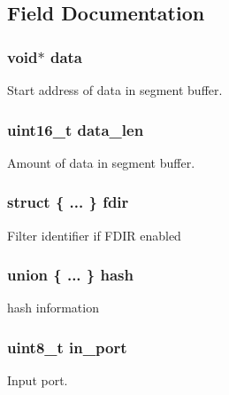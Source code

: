 \subsection{Field Documentation}
\hypertarget{structrte__pktmbuf_a735984d41155bc1032e09bece8f8d66d}{}
\subsubsection[{data}]{\setlength{\rightskip}{0pt plus 5cm}void$\ast$ data}\label{structrte__pktmbuf_a735984d41155bc1032e09bece8f8d66d}
Start address of data in segment buffer. \hypertarget{structrte__pktmbuf_ad1a572736a10ff6b282c5f43c4ea1ccf}{}
\subsubsection[{data\+\_\+len}]{\setlength{\rightskip}{0pt plus 5cm}uint16\+\_\+t data\+\_\+len}\label{structrte__pktmbuf_ad1a572736a10ff6b282c5f43c4ea1ccf}
Amount of data in segment buffer. \hypertarget{structrte__pktmbuf_a4228b21a34bc8766683ad1e9bc24dd3c}{}
\subsubsection[{fdir}]{\setlength{\rightskip}{0pt plus 5cm}struct \{ ... \}   fdir}\label{structrte__pktmbuf_a4228b21a34bc8766683ad1e9bc24dd3c}
Filter identifier if F\+D\+I\+R enabled \hypertarget{structrte__pktmbuf_a1afb10272967497f519ad87f70ef543a}{}
\subsubsection[{hash}]{\setlength{\rightskip}{0pt plus 5cm}union \{ ... \}   hash}\label{structrte__pktmbuf_a1afb10272967497f519ad87f70ef543a}
hash information \hypertarget{structrte__pktmbuf_ab49c6f120dff383ff203d3b6681f76ca}{}
\subsubsection[{in\+\_\+port}]{\setlength{\rightskip}{0pt plus 5cm}uint8\+\_\+t in\+\_\+port}\label{structrte__pktmbuf_ab49c6f120dff383ff203d3b6681f76ca}
Input port. \hypertarget{structrte__pktmbuf_a54163d61074a843b5a9560b74f7d3581}{}
